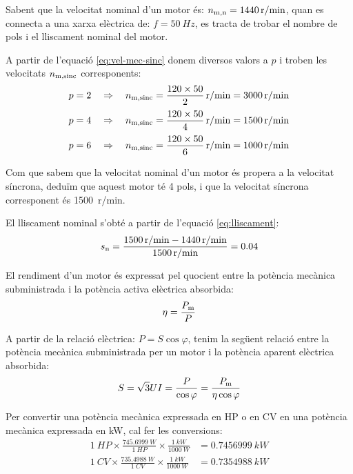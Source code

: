 	
\begin{exemple}[\MotorNombrePols{}]
	\addcontentsxms{\MotorNombrePols}
    Sabent que la velocitat nominal d'un motor és: $n_\mathrm{m,n} = \qty{1440}{r/min}$, quan es connecta a una xarxa elèctrica de: $f = \qty{50}{Hz}$,  es tracta de trobar el nombre de pols i el lliscament nominal del motor.

    A partir de l'equació \eqref{eq:vel-mec-sinc} donem diversos valors a $p$ i troben les velocitats $n_\mathrm{m,sinc}$ corresponents:
    \begin{align*}
      p = 2 \quad  &\Rightarrow \quad n\ped{m,sinc} = \frac{120 \times 50}{2} \, \unit{r/min} = \qty{3000}{r/min}\\[0.5ex]
      p = 4 \quad  &\Rightarrow \quad n\ped{m,sinc} = \frac{120 \times 50}{4} \, \unit{r/min} = \qty{1500}{r/min}\\[0.5ex]
      p = 6 \quad  &\Rightarrow \quad n\ped{m,sinc} = \frac{120 \times 50}{6} \, \unit{r/min} = \qty{1000}{r/min}
    \end{align*}

    Com que sabem que la velocitat nominal d'un motor és propera a la velocitat síncrona, deduïm que aquest motor té 4 pols, i que la velocitat síncrona corresponent és \qty{1500}{r/min}.

    El lliscament nominal s'obté a partir de l'equació \eqref{eq:lliscament}:
    \[
      s_\mathrm{n} = \frac{\qty{1500}{r/min} - \qty{1440}{r/min}}{\qty{1500}{r/min}} = \num{0,04}
    \]
\end{exemple}

El rendiment d'un motor és expressat pel quocient entre la potència mecànica subministrada i la potència activa elèctrica absorbida:
\begin{equation}\index{rendiment}\index{potència!mecànica}
    \eta = \frac{P\ped{m}}{P}
\end{equation}

A partir de la relació elèctrica: $P = S \cos\varphi$, tenim la següent relació entre la potència mecànica subministrada per un motor i la potència aparent elèctrica absorbida:
\begin{equation}
    S = \sqrt{3} U I = \frac{P}{\cos\varphi} = \frac{P_\mathrm{m}}{\eta \cos\varphi}\label{eq:mot-S-Pm}
\end{equation}

Per  convertir una potència mecànica expressada en HP o en CV en una  potència mecànica expressada en kW, cal  fer les conversions:
\begin{subequations}
\begin{align}
  \qty{1}{HP} \times \frac{\qty{745,6999}{W}}{\qty{1}{HP}} \times \frac{\qty{1}{kW}}{\qty{1000}{W}} &= \qty{0,7456999}{kW} \\[1ex]
  \qty{1}{CV} \times \frac{\qty{735,4988}{W}}{\qty{1}{CV}} \times \frac{\qty{1}{kW}}{\qty{1000}{W}} &= \qty{0,7354988}{kW}
\end{align}
\end{subequations}

